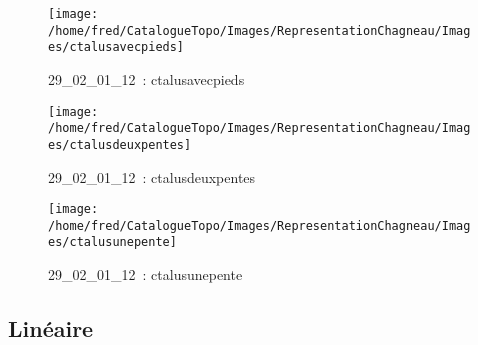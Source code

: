 \documentclass[12pt,titlepage]{book}
\begin{document}
\begin{figure}[h!]
\begin{minipage}[t]{3cm}
  \end{minipage}
  \begin{minipage}[t]{3cm}
    \begin{center}
      \texttt{[image: /home/fred/CatalogueTopo/Images/RepresentationChagneau/Images/ctalusavecpieds]}
      \caption[~29\_02\_01\_12]{\small{29\_02\_01\_12~:} \tiny{ctalusavecpieds}}\label{ctalusavecpieds}
    \end{center}
  \end{minipage}
  \begin{minipage}[t]{3cm}
    \begin{center}
      \texttt{[image: /home/fred/CatalogueTopo/Images/RepresentationChagneau/Images/ctalusdeuxpentes]}
      \caption[~29\_02\_01\_12]{\small{29\_02\_01\_12~:} \tiny{ctalusdeuxpentes}}\label{ctalusdeuxpentes}
    \end{center}
  \end{minipage}
  \begin{minipage}[t]{3cm}
    \begin{center}
      \texttt{[image: /home/fred/CatalogueTopo/Images/RepresentationChagneau/Images/ctalusunepente]}
      \caption[~29\_02\_01\_12]{\small{29\_02\_01\_12~:} \tiny{ctalusunepente}}\label{ctalusunepente}
    \end{center}
  \end{minipage}
\end{figure}


\subsection{Linéaire}
\noindent
\vspace{\baselineskip}
\end{document}

